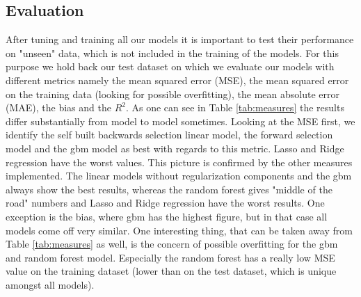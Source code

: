 \subsection{Evaluation}
After tuning and training all our models it is important to test their performance on "unseen" data, which is not included in the training of the models. For this purpose we hold back our test dataset on which we evaluate our models with different metrics namely the mean squared error (MSE), the mean squared error on the training data (looking for possible overfitting), the mean absolute error (MAE), the bias and the $R^2$. As one can see in Table \ref{tab:measures} the results differ substantially from model to model sometimes. Looking at the MSE first, we identify the self built backwards selection linear model, the forward selection model and the gbm model as best with regards to this metric. Lasso and Ridge regression have the worst values. This picture is confirmed by the other measures implemented. The linear models without regularization components and the gbm always show the best results, whereas the random forest gives "middle of the road" numbers and Lasso and Ridge regression have the worst results. One exception is the bias, where gbm has the highest figure, but in that case all models come off very similar. One interesting thing, that can be taken away from Table \ref{tab:measures} as well, is the concern of possible overfitting for the gbm and random forest model. Especially the random forest has a really low MSE value on the training dataset (lower than on the test dataset, which is unique amongst all models). 



